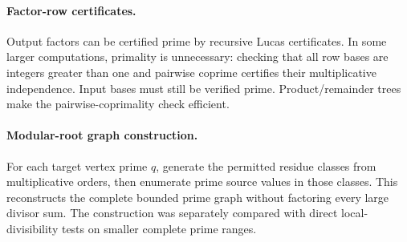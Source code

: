 \paragraph{Factor-row certificates.}
Output factors can be certified prime by recursive Lucas certificates. In some
larger computations, primality is unnecessary: checking that all row bases are
integers greater than one and pairwise coprime certifies their multiplicative
independence. Input bases must still be verified prime. Product/remainder trees
make the pairwise-coprimality check efficient.

\paragraph{Modular-root graph construction.}
For each target vertex prime $q$, generate the permitted residue classes from
multiplicative orders, then enumerate prime source values in those classes.
This reconstructs the complete bounded prime graph without factoring every
large divisor sum. The construction was separately compared with direct
local-divisibility tests on smaller complete prime ranges.

